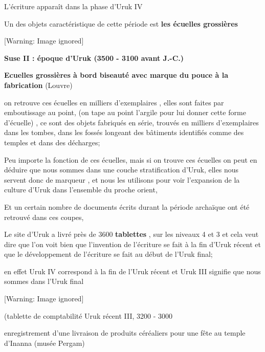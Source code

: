 \documentclass[a4paper,10pt]{article}
\begin{document}
L'écriture apparaît dans la phase
d'Uruk IV

Un des objets caractéristique de cette période est \textbf{les écuelles
grossières}

\newline


\begin{center}
 [Warning: Image ignored] %

\end{center}
\textbf{\textcolor[rgb]{0.18039216,0.18039216,0.18039216}{Suse II :
époque d'Uruk (3500 - 3100 avant J.-C.)}} 

\textbf{\textcolor[rgb]{0.18039216,0.18039216,0.18039216}{Ecuelles
grossières à bord biseauté avec marque du pouce à la fabrication}} 
(Louvre)

on retrouve ces écuelles en milliers d'exemplaires ,
elles sont faites par emboutissage au point,  (on tape au point
l'argile pour lui donner cette forme
d'écuelle) , ce sont des objets fabriqués en série,
trouvés en milliers d'exemplaires dans les tombes,
dans les fossés longeant des bâtiments identifiés comme des temples et
dans des décharges;

Peu importe la fonction de ces écuelles, mais si on trouve ces écuelles
on peut en déduire que nous sommes dans une couche stratification
d'Uruk, elles nous servent donc de marqueur , et nous
les utilisons pour voir l'expansion de la culture
d'Uruk dans l'ensemble du proche
orient, 

Et un certain nombre de documents écrits durant la période archaïque ont
été retrouvé dans ces coupes, 

Le site d'Uruk a livré près de 3600 \textbf{tablettes}
, sur les  niveaux 4 et 3 et cela veut dire que l'on
voit bien que l'invention de
l'écriture se fait à la fin d'Uruk
récent et que le développement de l'écriture se fait
au début de l'Uruk final;

en effet Uruk IV correspond à la fin de l'Uruk récent
et Uruk III signifie que nous sommes dans l'Uruk final

  [Warning: Image ignored] %
 

(tablette de comptabilité Uruk récent III, 3200 - 3000

enregistrement d'une livraison de produits céréaliers
pour une fête au temple d'Inanna (musée Pergam)
\end{document}
